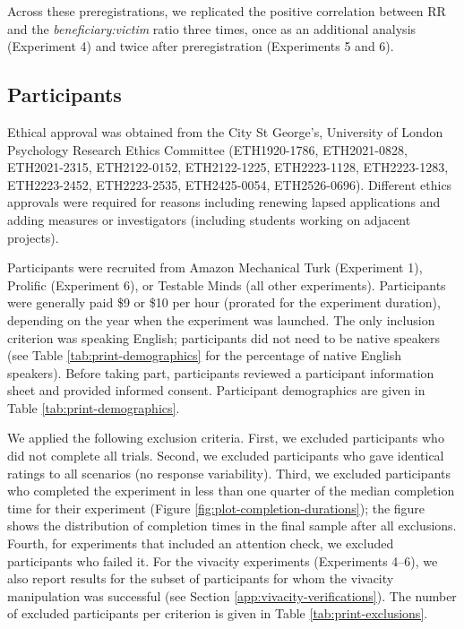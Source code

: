 \documentclass[
]{article}
\begin{document}
Across these preregistrations, we replicated the positive correlation between \(\mathrm{RR}\) and the \emph{beneficiary:victim} ratio three times, once as an additional analysis (Experiment 4) and twice after preregistration (Experiments 5 and 6).

\subsection{Participants}\label{app:participants}

Ethical approval was obtained from the City St George's, University of London Psychology Research Ethics Committee (ETH1920-1786, ETH2021-0828, ETH2021-2315, ETH2122-0152, ETH2122-1225, ETH2223-1128, ETH2223-1283, ETH2223-2452, ETH2223-2535, ETH2425-0054, ETH2526-0696). Different ethics approvals were required for reasons including renewing lapsed applications and adding measures or investigators (including students working on adjacent projects).

Participants were recruited from Amazon Mechanical Turk (Experiment 1), Prolific (Experiment 6), or Testable Minds (all other experiments). Participants were generally paid \$9 or \$10 per hour (prorated for the experiment duration), depending on the year when the experiment was launched. The only inclusion criterion was speaking English; participants did not need to be native speakers (see Table \ref{tab:print-demographics} for the percentage of native English speakers). Before taking part, participants reviewed a participant information sheet and provided informed consent. Participant demographics are given in Table \ref{tab:print-demographics}.

We applied the following exclusion criteria. First, we excluded participants who did not complete all trials. Second, we excluded participants who gave identical ratings to all scenarios (no response variability). Third, we excluded participants who completed the experiment in less than one quarter of the median completion time for their experiment (Figure \ref{fig:plot-completion-durations}); the figure shows the distribution of completion times in the final sample after all exclusions. Fourth, for experiments that included an attention check, we excluded participants who failed it. For the vivacity experiments (Experiments 4--6), we also report results for the subset of participants for whom the vivacity manipulation was successful (see Section \ref{app:vivacity-verifications}). The number of excluded participants per criterion is given in Table \ref{tab:print-exclusions}.
\end{document}
